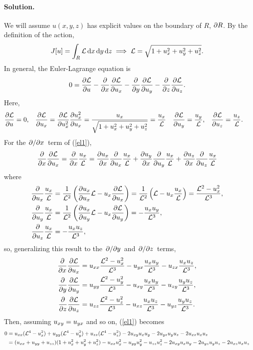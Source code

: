 \documentclass[11pt]{article}
\newcommand{\refeq}[1]{(\ref{#1})}
\newcommand{\beq}{\begin{equation}}
\newcommand{\eeq}{\end{equation}}
\newenvironment{solution}
{
    \paragraph{Solution.}
    \ignorespaces
}
{
}
\begin{document}
\begin{solution}
	We will assume $u(x, y, z)$ has explicit values on the boundary of $R$, $\partial R$.  By the definition of the action,
	\beq
		J[u] = \intr \Ld \dr \implies \Ld = \sqrt{1 + \ux^2 + \uy^2 + \uz^2}.
	\eeq
	In general, the Euler-Lagrange equation is
	\beq \label{el1}
		0 = \pdv{\Ld}{u} - \pdv{}{x} \pdv{\Ld}{\ux} - \pdv{}{y} \pdv{\Ld}{\uy} - \pdv{}{z} \pdv{\Ld}{\uz}.
	\eeq
	Here,
	\begin{align}
		\pdv{\mathcal{L}}{u} &= 0, &
		\pdv{\mathcal{L}}{u_x} &= \pdv{\mathcal{L}}{u_x^2} \pdv{u_x^2}{u_x} = \frac{u_x}{\sqrt{1 + u_x^2 + u_y^2 + u_z^2}} = \frac{u_x}{\mathcal{L}} &
		\pdv{\mathcal{L}}{u_y} &= \frac{u_y}{\mathcal{L}}, &
		\pdv{\mathcal{L}}{u_z} &= \frac{u_z}{\mathcal{L}}.
	\end{align}
	For the $\pdv*{}{x}$ term of \refeq{el1},
	\beq
		\pdv{}{x} \pdv{\Ld}{\ux} = \pdv{}{x} \frac{\ux}{\Ld} = \pdv{\ux}{x} \pdv{}{\ux} \frac{\ux}{\Ld} + \pdv{\uy}{x} \pdv{}{\uy} \frac{\ux}{\Ld} + \pdv{\uz}{x} \pdv{}{\uz} \frac{\ux}{\Ld}
	\eeq
	where
	\begin{align}
		\pdv{}{u_x} \frac{u_x}{\mathcal{L}} &= \frac{1}{\mathcal{L}^2} \left(\pdv{u_x}{u_x} \mathcal{L} - u_x \pdv{\mathcal{L}}{u_x} \right) = \frac{1}{\mathcal{L}^2} \left( \mathcal{L} - u_x \frac{u_x}{\mathcal{L}} \right) = \frac{\mathcal{L}^2 - u_x^2}{\mathcal{L}^3}, \\
		\pdv{}{u_y} \frac{u_x}{\mathcal{L}} &= \frac{1}{\mathcal{L}^2} \left(\pdv{u_x}{u_y} \mathcal{L} - u_x \pdv{\mathcal{L}}{u_y} \right) = -\frac{u_x u_y}{\mathcal{L}^3}, \\
		\pdv{}{u_z} \frac{u_x}{\mathcal{L}} &= -\frac{u_x u_z}{\mathcal{L}^3},
	\end{align}
	so, generalizing this result to the $\pdv*{}{y}$ and $\pdv*{}{z}$ terms,
	\begin{align}
		\pdv{}{x} \pdv{\mathcal{L}}{u_x} &= u_{xx} \frac{\mathcal{L}^2 - u_x^2}{\mathcal{L}^3} - u_{yx} \frac{u_x u_y}{\mathcal{L}^3} - u_{zx} \frac{u_x u_z}{\mathcal{L}^3}, \\
		\pdv{}{y} \pdv{\mathcal{L}}{u_y} &= u_{yy} \frac{\mathcal{L}^2 - u_y^2}{\mathcal{L}^3} - u_{xy} \frac{u_x u_y}{\mathcal{L}^3} - u_{zy} \frac{u_y u_z}{\mathcal{L}^3}, \\
		\pdv{}{z} \pdv{\mathcal{L}}{u_z} &= u_{zz} \frac{\mathcal{L}^2 - u_z^2}{\mathcal{L}^3} - u_{xz} \frac{u_x u_z}{\mathcal{L}^3} - u_{yz} \frac{u_y u_z}{\mathcal{L}^3}.
	\end{align}
	Then, assuming $u_{xy} = u_{yx}$ and so on, \refeq{el1} becomes
	\begin{align}
		0 &= \uxx (\Ld^4 - \ux^2) + \uyy (\Ld^4 - \uy^2) + \uzz (\Ld^4 - \uz^2) - 2 \uxy \ux \uy - 2 \uyz \uy \uz - 2 \uxz \ux \uz \\
		&= (\uxx + \uyy + \uzz) (1 + \ux^2 + \uy^2 + \uz^2) - \uxx \ux^2 - \uyy \uy^2 - \uzz \uz^2 - 2 \uxy \ux \uy - 2 \uyz \uy \uz - 2 \uxz \ux \uz \\

\end{align}
\end{solution}
\end{document}

